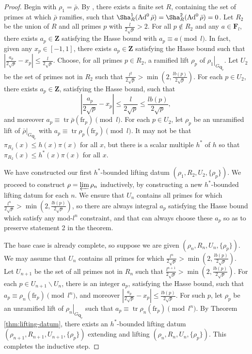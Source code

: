 \documentclass{article}
\DeclareMathOperator{\Ad}{Ad}
\DeclareMathOperator{\tr}{tr}
\newcommand{\bF}{\mathbf{F}}
\newcommand{\bQ}{\mathbf{Q}}
\newcommand{\bZ}{\mathbf{Z}}
\newcommand{\frob}{\mathrm{fr}}
\begin{document}
\begin{proof}
Begin with $\rho_1= \bar\rho$. By \cite[Lem.~6]{klr}, 
there exists a finite set $R$, containing the set of primes at which $\bar\rho$ 
ramifies, such that $\Sha_R^1(\Ad^0\bar\rho) = \Sha_R^2(\Ad^0\bar\rho) = 0$. 
Let $R_2$ be the union of $R$ and all primes $p$ with 
$\frac{l}{2\sqrt p} > 2$. For all $p\notin R_2$ and any $a\in \bF_l$, there 
exists $a_p\in \bZ$ satisfying the Hasse bound with $a_p\equiv a\pmod l$. In 
fact, given any $x_p\in [-1,1]$, there exists $a_p\in \bZ$ satisfying the Hasse 
bound such that 
$\left| \frac{a_p}{2\sqrt p} - x_p\right| \leqslant \frac{l}{2\sqrt p}$.
Choose, for all primes $p\in R_2$, a ramified 
lift $\rho_p$ of $\left. \rho_1\right|_{G_{\bQ_p}}$. Let $U_2$ be the set of 
primes not in $R_2$ such that 
$\frac{l^2}{2\sqrt p} > \min\left(2, \frac{l b(p)}{2\sqrt p}\right)$. 
For each $p\in U_2$, there exists $a_p\in \bZ$, satisfying the 
Hasse bound, such that 
\[
	\left| \frac{a_p}{2\sqrt p} - x_p\right| \leqslant \frac{l}{2\sqrt p} \leqslant \frac{l b(p)}{2\sqrt p} ,
\]
and moreover $a_p\equiv \tr\bar\rho(\frob_p)\pmod l$. For each $p\in U_2$, let 
$\rho_p$ be an unramified lift of $\left.\bar\rho\right|_{G_{\bQ_p}}$ with 
$a_p\equiv\tr\rho_p(\frob_p)\pmod l$. It may not be that 
$\pi_{R_2}(x) \leqslant h(x) \pi(x)$ for all $x$, but there is a scalar 
multiple $h^\ast$ of $h$ so that $\pi_{R_2}(x) \leqslant h^\ast(x) \pi(x)$ for 
all $x$. 

We have constructed our first $h^\ast$-bounded lifting datum 
$(\rho_1,R_2,U_2,\{\rho_p\})$. We proceed to construct 
$\rho = \varprojlim \rho_n$ inductively, by constructing a new $h^\ast$-bounded 
lifting datum for each $n$. We ensure that $U_n$ contains all primes for which 
$\frac{l^n}{2\sqrt p} > \min\left(2, \frac{l b(p)}{2\sqrt p}\right)$, so there 
are always integral $a_p$ satisfying the Hasse bound which satisfy any 
mod-$l^n$ constraint, and that can always choose these $a_p$ so as to preserve 
statement 2 in the theorem. 

The base case is already complete, so suppose we are given 
$(\rho_n,R_n,U_n,\{\rho_p\})$. We may assume that $U_n$ contains all primes for 
which $\frac{l^n}{2\sqrt p} > \min\left(2, \frac{l b(p)}{2\sqrt p}\right)$. Let 
$U_{n+1}$ be the set of all primes not in $R_n$ such that 
$\frac{l^{n+1}}{2\sqrt p} > \min\left(2, \frac{l b(p)}{2\sqrt p}\right)$. For 
each $p\in U_{n+1}\smallsetminus U_n$, there is an integer $a_p$, satisfying 
the Hasse bound, such that $a_p\equiv \rho_n(\frob_p)\pmod{l^n}$, and moreover 
$\left|\frac{a_p}{2\sqrt p} - x_p\right| \leqslant \frac{l b(p)}{2\sqrt p}$. 
For such $p$, let $\rho_p$ be an unramified lift of 
$\left. \rho_n\right|_{G_{\bQ_p}}$ such that 
$a_p\equiv\tr\rho_n(\frob_p)\pmod{l^n}$. By Theorem \ref{thm:lifting-datum}, 
there exists an $h^\ast$-bounded lifting datum 
$(\rho_{n+1},R_{n+1},U_{n+1},\{\rho_p\})$ extending and lifting 
$(\rho_n,R_n,U_n,\{\rho_p\})$. This completes the inductive step.  
\end{proof}
\end{document}
